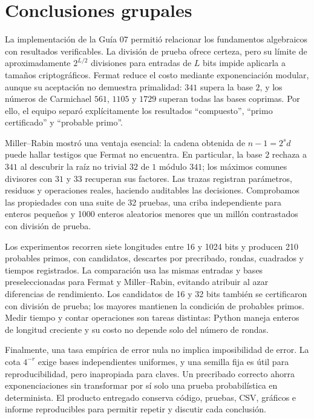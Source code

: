 \section{Conclusiones grupales}
La implementación de la Guía 07 permitió relacionar los fundamentos algebraicos con resultados verificables. La división de prueba ofrece certeza, pero su límite de aproximadamente $2^{L/2}$ divisiones para entradas de $L$ bits impide aplicarla a tamaños criptográficos. Fermat reduce el costo mediante exponenciación modular, aunque su aceptación no demuestra primalidad: $341$ supera la base $2$, y los números de Carmichael $561$, $1105$ y $1729$ superan todas las bases coprimas. Por ello, el equipo separó explícitamente los resultados ``compuesto'', ``primo certificado'' y ``probable primo''.

Miller--Rabin mostró una ventaja esencial: la cadena obtenida de $n-1=2^sd$ puede hallar testigos que Fermat no encuentra. En particular, la base $2$ rechaza a $341$ al descubrir la raíz no trivial $32$ de $1$ módulo $341$; los máximos comunes divisores con $31$ y $33$ recuperan sus factores. Las trazas registran parámetros, residuos y operaciones reales, haciendo auditables las decisiones. Comprobamos las propiedades con una suite de 32 pruebas, una criba independiente para enteros pequeños y 1000 enteros aleatorios menores que un millón contrastados con división de prueba.

Los experimentos recorren siete longitudes entre 16 y 1024 bits y producen 210 probables primos, con candidatos, descartes por precribado, rondas, cuadrados y tiempos registrados. La comparación usa las mismas entradas y bases preseleccionadas para Fermat y Miller--Rabin, evitando atribuir al azar diferencias de rendimiento. Los candidatos de 16 y 32 bits también se certificaron con división de prueba; los mayores mantienen la condición de probables primos. Medir tiempo y contar operaciones son tareas distintas: Python maneja enteros de longitud creciente y su costo no depende solo del número de rondas.

Finalmente, una tasa empírica de error nula no implica imposibilidad de error. La cota $4^{-r}$ exige bases independientes uniformes, y una semilla fija es útil para reproducibilidad, pero inapropiada para claves. Un precribado correcto ahorra exponenciaciones sin transformar por sí solo una prueba probabilística en determinista. El producto entregado conserva código, pruebas, CSV, gráficos e informe reproducibles para permitir repetir y discutir cada conclusión.
